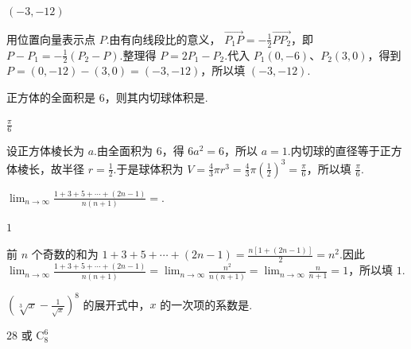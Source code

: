 \begin{answer}
\(\left( -3,-12 \right)\)
\end{answer}

\begin{solution}
用位置向量表示点 \(P\).由有向线段比的意义，
\(\overrightarrow{P_1P}=-\frac{1}{2}\overrightarrow{PP_2}\)，即
\(P-P_1=-\frac{1}{2}(P_2-P)\).整理得
\(P=2P_1-P_2\).代入 \(P_1(0,-6)\)、\(P_2(3,0)\)，得到
\(P=(0,-12)-(3,0)=(-3,-12)\)，所以填 \(\left(-3,-12\right)\).
\end{solution}

\begin{problem}

正方体的全面积是 \(6\)，则其内切球体积是\fillinblank{}.
\end{problem}

\begin{answer}
\(\frac{\pi}{6}\)
\end{answer}

\begin{solution}
设正方体棱长为 \(a\).由全面积为 \(6\)，得 \(6a^2=6\)，所以 \(a=1\).内切球的直径等于正方体棱长，故半径 \(r=\frac{1}{2}\).于是球体积为
\(V=\frac{4}{3}\pi r^3=\frac{4}{3}\pi\left(\frac{1}{2}\right)^3=\frac{\pi}{6}\)，所以填 \(\frac{\pi}{6}\).
\end{solution}

\begin{problem}

\(\displaystyle\lim_{n\to\infty}\frac{1+3+5+\cdots+(2n-1)}{n(n+1)}=\)\fillinblank{}.
\end{problem}

\begin{answer}
\(1\)
\end{answer}

\begin{solution}
前 \(n\) 个奇数的和为
\(1+3+5+\cdots+(2n-1)=\frac{n\left[1+(2n-1)\right]}{2}=n^2\).因此
\(\displaystyle\lim_{n\to\infty}\frac{1+3+5+\cdots+(2n-1)}{n(n+1)}=\lim_{n\to\infty}\frac{n^2}{n(n+1)}=\lim_{n\to\infty}\frac{n}{n+1}=1\)，所以填 \(1\).
\end{solution}

\begin{problem}

\(\left( \sqrt[3]{x}-\frac{1}{\sqrt{x}} \right)^8\) 的展开式中，\(x\) 的一次项的系数是\fillinblank{}.
\end{problem}

\begin{answer}
\(28\) 或 \(\mathrm C_8^6\)
\end{answer}

